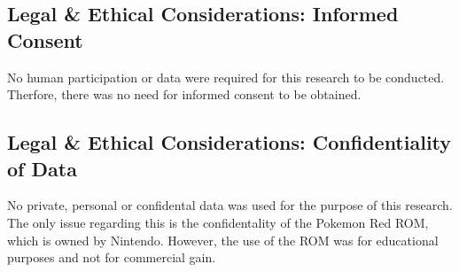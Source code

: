 \subsection{Legal \& Ethical Considerations: Informed Consent}

No human participation or data were required for this research to be conducted. Therfore, there was no need for informed consent to be obtained. 

\subsection{Legal \& Ethical Considerations: Confidentiality of Data}

No private, personal or confidental data was used for the purpose of this research. The only issue regarding this is the confidentality of the Pokemon Red ROM, which is owned by Nintendo. However, the use of the ROM was for educational purposes and not for commercial gain.